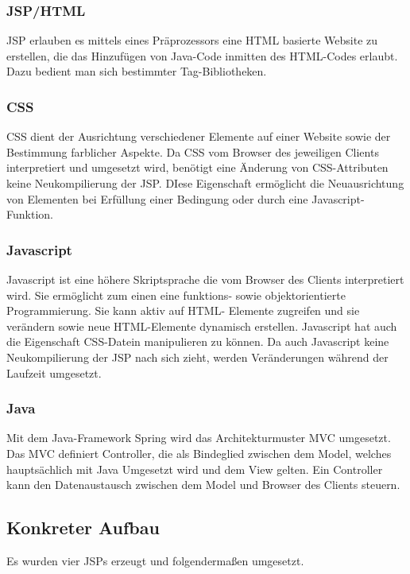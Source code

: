 \subsubsection*{\acs{JSP}/HTML}
\ac{JSP} erlauben es mittels eines Präprozessors eine HTML basierte 
Website zu erstellen, die das Hinzufügen von Java-Code inmitten des HTML-Codes erlaubt. Dazu bedient 
man sich bestimmter Tag-Bibliotheken.
 
\subsubsection*{CSS}
CSS dient der Ausrichtung verschiedener Elemente auf einer Website sowie der Bestimmung farblicher 
Aspekte. Da CSS vom Browser des jeweiligen Clients interpretiert und umgesetzt wird, benötigt eine 
Änderung von CSS-Attributen keine Neukompilierung der \acs{JSP}. DIese Eigenschaft ermöglicht 
die Neuausrichtung von Elementen bei Erfüllung einer Bedingung oder durch eine Javascript-Funktion. 

\subsubsection*{Javascript}
Javascript ist eine höhere Skriptsprache die vom Browser des Clients interpretiert wird. Sie 
ermöglicht zum einen eine funktions- sowie objektorientierte Programmierung. Sie kann aktiv auf HTML-
Elemente  zugreifen und sie verändern sowie neue HTML-Elemente dynamisch erstellen. 
Javascript hat auch die Eigenschaft CSS-Datein manipulieren zu können. Da auch Javascript keine 
Neukompilierung der JSP nach sich zieht, werden Veränderungen während der Laufzeit umgesetzt.

\subsubsection*{Java} 
Mit dem Java-Framework Spring wird das Architekturmuster MVC umgesetzt. Das MVC definiert Controller, 
die als Bindeglied zwischen dem Model, welches  hauptsächlich  mit Java Umgesetzt wird und dem View 
gelten. Ein Controller kann den Datenaustausch zwischen dem Model und Browser des Clients steuern.

\subsection{Konkreter Aufbau}
Es wurden vier JSPs erzeugt und folgendermaßen umgesetzt.


